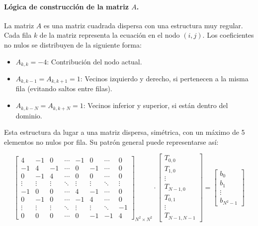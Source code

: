 \documentclass{article}
\begin{document}
\paragraph{Lógica de construcción de la matriz $A$.} La matriz $A$ es una matriz cuadrada dispersa con una estructura muy regular. Cada fila $k$ de la matriz representa la ecuación en el nodo $(i,j)$. Los coeficientes no nulos se distribuyen de la siguiente forma:

\begin{itemize}
    \item $A_{k,k} = -4$: Contribución del nodo actual.
    \item $A_{k,k-1} = A_{k,k+1} = 1$: Vecinos izquierdo y derecho, si pertenecen a la misma fila (evitando saltos entre filas).
    \item $A_{k,k-N} = A_{k,k+N} = 1$: Vecinos inferior y superior, si están dentro del dominio.
\end{itemize}

\noindent Esta estructura da lugar a una matriz dispersa, simétrica, con un máximo de 5 elementos no nulos por fila. Su patrón general puede representarse así:

$$
\begin{bmatrix}
4 & -1 & 0 & \cdots & -1 & 0 & \cdots & 0 \\
-1 & 4 & -1 & \cdots & 0 & -1 & \cdots & 0 \\
0 & -1 & 4 & \cdots & 0 & 0 & \cdots & 0 \\
\vdots & \vdots & \vdots & \ddots & \vdots & \vdots & \ddots & \vdots \\
-1 & 0 & 0 & \cdots & 4 & -1 & \cdots & 0 \\
0 & -1 & 0 & \cdots & -1 & 4 & \cdots & 0 \\
\vdots & \vdots & \vdots & \ddots & \vdots & \vdots & \ddots & -1 \\
0 & 0 & 0 & \cdots & 0 & -1 & -1 & 4
\end{bmatrix}_{N^2 \times N^2}
\cdot
\begin{bmatrix}
T_{0,0} \\
T_{1,0} \\
\vdots \\
T_{N-1,0} \\
T_{0,1} \\
\vdots \\
T_{N-1,N-1}
\end{bmatrix}
=
\begin{bmatrix}
b_0 \\
b_1 \\
\vdots \\
b_{N^2-1}
\end{bmatrix}
$$
\end{document}
